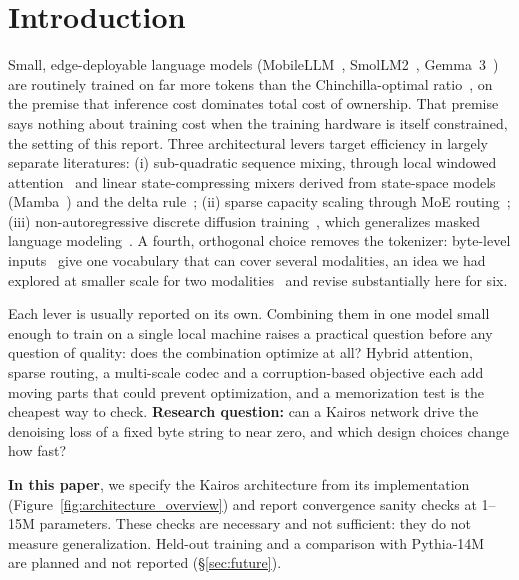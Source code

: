 \documentclass[11pt]{article}
\begin{document}
\section{Introduction}

Small, edge-deployable language models
(MobileLLM~\citep{liu2024mobilellm}, SmolLM2~\citep{allal2025smollm2},
Gemma~3~\citep{gemma3}) are routinely trained on far more tokens than the
Chinchilla-optimal ratio~\citep{hoffmann2022chinchilla}, on the premise that
inference cost dominates total cost of ownership. That premise says nothing
about training cost when the training hardware is itself constrained, the
setting of this report. Three architectural levers target efficiency in
largely separate literatures: (i) sub-quadratic sequence mixing, through
local windowed attention~\citep{beltagy2020longformer,jiang2023mistral} and
linear state-compressing mixers derived from state-space models
(Mamba~\citep{gu2023mamba}) and the delta
rule~\citep{yang2024deltanet,yang2024gateddeltanet}; (ii) sparse capacity
scaling through MoE
routing~\citep{shazeer2017outrageously,fedus2021switch,dai2024deepseekmoe,deepseekv3};
(iii) non-autoregressive discrete diffusion
training~\citep{austin2021d3pm,lou2023sedd,sahoo2024mdlm,nie2025llada}, which
generalizes masked language modeling~\citep{devlin2018bert}. A fourth,
orthogonal choice removes the tokenizer: byte-level
inputs~\citep{xue2022byt5,yu2023megabyte,pagnoni2024blt} give one vocabulary
that can cover several modalities, an idea we had explored at smaller scale for two
modalities~\citep{furfaro2024pixelbytes} and revise substantially here for six.

Each lever is usually reported on its own. Combining them in one model small enough to
train on a single local machine raises a practical question before any question of
quality: does the combination optimize at all? Hybrid attention, sparse routing, a
multi-scale codec and a corruption-based objective each add moving parts that could
prevent optimization, and a memorization test is the cheapest way to check.
\textbf{Research question:} can a Kairos network drive the denoising loss of a fixed byte
string to near zero, and which design choices change how fast?

\textbf{In this paper}, we specify the Kairos architecture from its implementation
(Figure~\ref{fig:architecture_overview}) and report convergence sanity checks at
1--15M parameters. These checks are necessary and not sufficient: they do not measure
generalization. Held-out training and a comparison with Pythia-14M~\citep{biderman2023pythia}
are planned and not reported (\S\ref{sec:future}).
\end{document}
